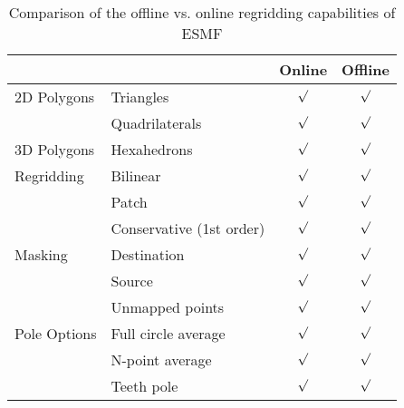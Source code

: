 \begin{table}[ht]
\centering
\vspace{0.2cm}
\begin{tabular}{| l | l | c c |}
\hline
& & Online & Offline \\ [0.5ex]
\hline
2D Polygons & Triangles & $\surd$ & $\surd$ \\
& Quadrilaterals & $\surd$ & $\surd$ \\
\hline
3D Polygons & Hexahedrons & $\surd$ & $\surd$ \\
\hline
Regridding & Bilinear & $\surd$ & $\surd$ \\
& Patch & $\surd$ & $\surd$ \\
& Conservative (1st order) & $\surd$ & $\surd$ \\
\hline
Masking & Destination & $\surd$ & $\surd$ \\
& Source & $\surd$ &  $\surd$ \\
& Unmapped points & $\surd$ & $\surd$ \\
\hline
Pole Options & Full circle average & $\surd$ & $\surd$ \\
& N-point average & $\surd$ & $\surd$ \\
& Teeth pole & $\surd$ & $\surd$ \\[1ex]
\hline
\end{tabular}
\label{Regriddingcapabilities}
\caption{Comparison of the offline vs. online regridding capabilities of ESMF}
\end{table}


